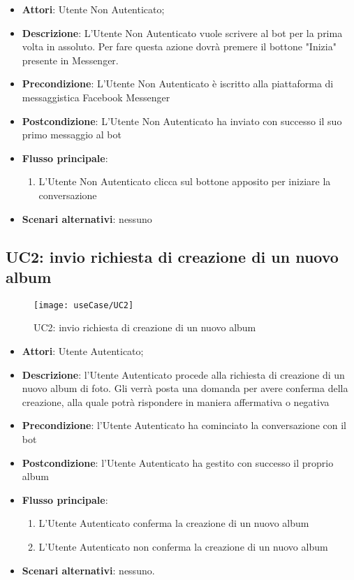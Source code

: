 \begin{itemize}
  \item \textbf{Attori}: Utente Non Autenticato;
  \item \textbf{Descrizione}: L'Utente Non Autenticato vuole scrivere al bot
per la prima volta in assoluto. Per fare questa azione dovrà premere il bottone
"Inizia" presente in Messenger.
  \item \textbf{Precondizione}: L'Utente Non Autenticato è iscritto alla
piattaforma di messaggistica Facebook Messenger
  \item \textbf{Postcondizione}: L'Utente Non Autenticato ha inviato con
successo il suo primo messaggio al bot
  \item \textbf{Flusso principale}:
  \begin{enumerate}
    \item L'Utente Non Autenticato clicca sul bottone apposito per iniziare la
conversazione
  \end{enumerate}
  \item \textbf{Scenari alternativi}: nessuno
\end{itemize}



\newpage

\subsection{UC2: invio richiesta di creazione di un nuovo album}
\label{uc:uc2}

\begin{figure}[H]
  \centering
  \texttt{[image: useCase/UC2]}
  \caption{UC2: invio richiesta di creazione di un nuovo album}
\end{figure}

\begin{itemize}
  \item \textbf{Attori}: Utente Autenticato;
  \item \textbf{Descrizione}: l'Utente Autenticato procede alla richiesta di
creazione di un nuovo album di foto. Gli verrà posta una domanda per avere
conferma della creazione, alla quale potrà rispondere in maniera affermativa o
negativa
  \item \textbf{Precondizione}: l'Utente Autenticato ha cominciato la
conversazione con il bot
  \item \textbf{Postcondizione}: l'Utente Autenticato ha gestito con successo
il proprio album
  \item \textbf{Flusso principale}:
  \begin{enumerate}
    \item L'Utente Autenticato conferma la creazione di un nuovo album
    \item L'Utente Autenticato non conferma la creazione di un nuovo album
  \end{enumerate}
  \item \textbf{Scenari alternativi}: nessuno.
\end{itemize}

